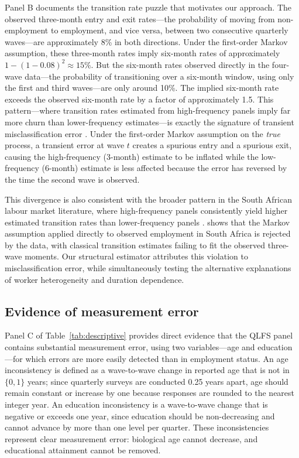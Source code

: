 Panel B documents the transition rate puzzle that motivates our approach.
The observed three-month entry and exit rates---the probability of moving from
non-employment to employment, and vice versa, between two consecutive quarterly
waves---are approximately 8\% in both directions. Under the first-order Markov
assumption, these three-month rates imply six-month rates of approximately
$1 - (1-0.08)^2 \approx 15\%$. But the six-month rates observed directly in
the four-wave data---the probability of transitioning over a six-month window,
using only the first and third waves---are only around 10\%. The implied
six-month rate exceeds the observed six-month rate by a factor of approximately
1.5. This pattern---where transition rates estimated from high-frequency panels
imply far more churn than lower-frequency estimates---is exactly the signature of
transient misclassification error \citep{meyer1988,porteba1986}. Under the
first-order Markov assumption on the \emph{true} process, a transient error at
wave $t$ creates a spurious entry and a spurious exit, causing the high-frequency
(3-month) estimate to be inflated while the low-frequency (6-month) estimate is
less affected because the error has reversed by the time the second wave is
observed.

This divergence is also consistent with the broader pattern in the South African
labour market literature, where high-frequency panels consistently yield higher
estimated transition rates than lower-frequency panels
\citep{banerjee2008,cichello2014}. \citet{burger2016} shows that the Markov
assumption applied directly to observed employment in South Africa is rejected
by the data, with classical transition estimates failing to fit the observed
three-wave moments. Our structural estimator attributes this violation to
misclassification error, while simultaneously testing the alternative explanations
of worker heterogeneity and duration dependence.

\subsection{Evidence of measurement error}

Panel C of Table~\ref{tab:descriptive} provides direct evidence that the QLFS
panel contains substantial measurement error, using two variables---age and
education---for which errors are more easily detected than in employment status.
An age inconsistency is defined as a wave-to-wave change in reported age that
is not in $\{0, 1\}$ years; since quarterly surveys are conducted 0.25 years apart,
age should remain constant or increase by one because responses are rounded to the nearest
integer year. An education
inconsistency is a wave-to-wave change that is negative or exceeds one year,
since education should be non-decreasing and cannot advance by more than one
level per quarter. These inconsistencies represent clear measurement error:
biological age cannot decrease, and educational attainment cannot be removed.

